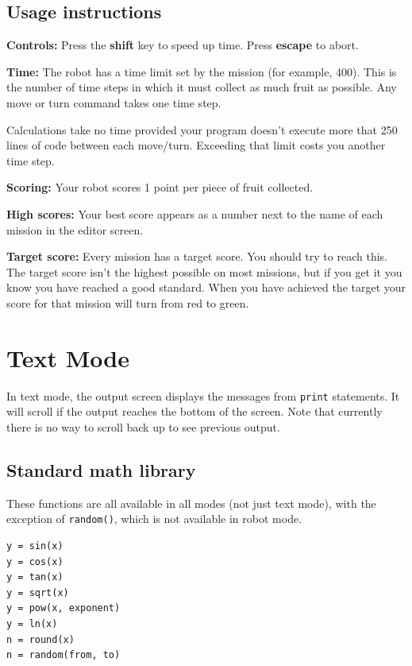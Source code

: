 \documentclass[12pt,a4paper,twoside]{article}
\renewcommand{\_}{\texttt{\symbol{95}}}
\begin{document}
\subsection{Usage instructions}

\textbf{Controls:}
Press the \textbf{shift} key to speed up time. Press \textbf{escape} to abort.

\textbf{Time:}
The robot has a time limit set by the mission (for example, 400).
This is the number of time steps in which it must collect as much fruit
as possible. Any move or turn command takes one time step.

Calculations take no time provided your program doesn't
execute more that 250 lines of code between each move/turn.
Exceeding that limit costs you another time step.

\textbf{Scoring:}
Your robot scores 1 point per piece of fruit collected. 

\textbf{High scores:}
Your best score appears as a number next to the name of each mission
in the editor screen.

\textbf{Target score:}
Every mission has a target score. You should try to reach this.
The target score isn't the highest possible on most missions, but
if you get it you know you have reached a good standard. When you have
achieved the target your score for that mission will turn from red to green.

\newpage
\section{Text Mode} \label{sec:text-mode}

In text mode, the output screen displays the messages from \verb^print^
statements. It will scroll if the output reaches the bottom of the screen.
Note that currently there is no way to scroll back up to see previous output.

\subsection{Standard math library} \label{sec:stand-math-libr}

These functions are all available in all modes (not just text mode),
with the exception of \verb^random()^, which is not available in
robot mode.

\begin{verbatim}
y = sin(x)
y = cos(x)
y = tan(x)
y = sqrt(x)
y = pow(x, exponent)
y = ln(x)
n = round(x)
n = random(from, to)
\end{verbatim}
\end{document}
